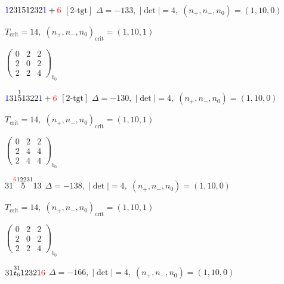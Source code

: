\documentclass[10pt]{article}
\begin{document}
\smallskip

$\textcolor{blue}{1}23151232\textcolor{blue}{1}+\textcolor{red}{6}$ $\scriptstyle [2\text{-tgt}]$ \quad $\Delta=-133,\; |\det|=4,\; (n_+,n_-,n_0)=(1,10,0)$

\hspace{1em}$T_{\text{crit}}=14,\; (n_+,n_-,n_0)_{\text{crit}}=(1,10,1)$

\hspace{2em}$\left(\begin{smallmatrix}0 & 2 & 2 \\ 2 & 0 & 2 \\ 2 & 2 & 4\end{smallmatrix}\right)_{\!b_0}$

\smallskip

$\textcolor{blue}{1}31\overset{1}{5}1322\textcolor{blue}{1}+\textcolor{red}{6}$ $\scriptstyle [2\text{-tgt}]$ \quad $\Delta=-130,\; |\det|=4,\; (n_+,n_-,n_0)=(1,10,0)$

\hspace{1em}$T_{\text{crit}}=14,\; (n_+,n_-,n_0)_{\text{crit}}=(1,10,1)$

\hspace{2em}$\left(\begin{smallmatrix}0 & 2 & 2 \\ 2 & 4 & 4 \\ 2 & 4 & 4\end{smallmatrix}\right)_{\!b_0}$

\smallskip

$31\overset{\textcolor{red}{6}12231}{5}13$ \quad $\Delta=-138,\; |\det|=4,\; (n_+,n_-,n_0)=(1,10,0)$

\hspace{1em}$T_{\text{crit}}=14,\; (n_+,n_-,n_0)_{\text{crit}}=(1,10,1)$

\hspace{2em}$\left(\begin{smallmatrix}0 & 2 & 2 \\ 2 & 0 & 2 \\ 2 & 2 & 4\end{smallmatrix}\right)_{\!b_0}$

\smallskip

$31\overset{31}{\mathfrak{e}_6}12321\textcolor{red}{6}$ \quad $\Delta=-166,\; |\det|=4,\; (n_+,n_-,n_0)=(1,10,0)$
\end{document}
